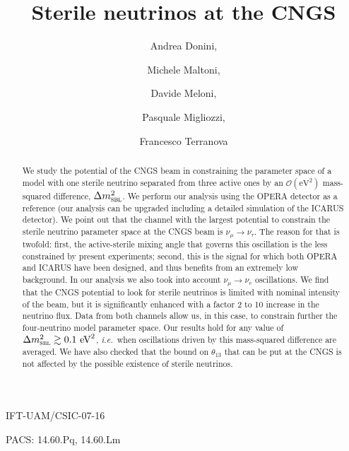 \documentclass[12pt]{elsart}
\newcommand{\eVq}{\ensuremath{\text{eV}^2}}
\newcommand{\Dmq}{\Delta m^2}
\newcommand{\Sbl}{\textsc{sbl}}
\begin{document}
\begin{frontmatter}

\begin{flushright}
    IFT-UAM/CSIC-07-16
\end{flushright}

\title{Sterile neutrinos at the CNGS} 

\author[ad:Madrid]{Andrea Donini,}
\author[ad:Madrid]{Michele Maltoni,}
\author[ad:Roma]{Davide Meloni,}
\author[ad:Napoli]{Pasquale Migliozzi,}
\author[ad:Frascati]{Francesco Terranova}

\address[ad:Madrid]{%
  Instituto F\'{\i}sica Te\'orica UAM/CSIC,
  Cantoblanco, E-28049 Madrid, Spain}

\address[ad:Roma]{%
  I.N.F.N., Sezione di Roma I and Dip.\ Fisica, Univ.\ Roma ``La
  Sapienza'', Pl.~A.~Moro 2, I-00185, Rome, Italy}

\address[ad:Napoli]{%
  I.N.F.N., Sezione di Napoli, I-80126, Naples, Italy}

\address[ad:Frascati]{%
  I.N.F.N., Laboratori Nazionali Frascati, Via E.~Fermi 40, I-00044,
  Frascati, Italy}

\begin{abstract}
    We study the potential of the CNGS beam in constraining the
    parameter space of a model with one sterile neutrino separated
    from three active ones by an $\mathcal{O}(\eVq)$ mass-squared
    difference, $\Dmq_\Sbl$.  We perform our analysis using the OPERA
    detector as a reference (our analysis can be upgraded including a
    detailed simulation of the ICARUS detector). We point out that the
    channel with the largest potential to constrain the sterile
    neutrino parameter space at the CNGS beam is $\nu_\mu \to
    \nu_\tau$. The reason for that is twofold: first, the
    active-sterile mixing angle that governs this oscillation is the
    less constrained by present experiments; second, this is the
    signal for which both OPERA and ICARUS have been designed, and
    thus benefits from an extremely low background. In our analysis we
    also took into account $\nu_\mu \to \nu_e$ oscillations.  We find
    that the CNGS potential to look for sterile neutrinos is limited
    with nominal intensity of the beam, but it is significantly
    enhanced with a factor 2 to 10 increase in the neutrino flux. Data
    from both channels allow us, in this case, to constrain further
    the four-neutrino model parameter space. Our results hold for any
    value of $\Dmq_\Sbl \gtrsim 0.1~\eVq$, \textit{i.e.}\ when
    oscillations driven by this mass-squared difference are averaged.
    We have also checked that the bound on $\theta_{13}$ that can be put
    at the CNGS is not affected by the possible existence of sterile neutrinos.
\end{abstract}

\begin{flushleft}
    \vskip 2cm
    \small
    {PACS: 14.60.Pq, 14.60.Lm}
\end{flushleft}

\end{frontmatter}
\end{document}

